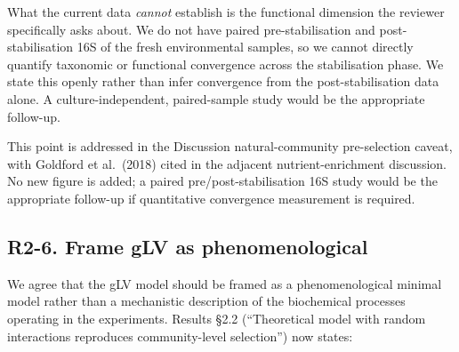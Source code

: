 What the current data \emph{cannot} establish is the functional dimension the reviewer specifically asks about. We do not have paired pre-stabilisation and post-stabilisation 16S of the fresh environmental samples, so we cannot directly quantify taxonomic or functional convergence across the stabilisation phase. We state this openly rather than infer convergence from the post-stabilisation data alone. A culture-independent, paired-sample study would be the appropriate follow-up.

This point is addressed in the Discussion natural-community pre-selection caveat, with Goldford et al.\ (2018) cited in the adjacent nutrient-enrichment discussion. No new figure is added; a paired pre/post-stabilisation 16S study would be the appropriate follow-up if quantitative convergence measurement is required.


\subsection*{R2-6. Frame gLV as phenomenological}


\responselabel
We agree that the gLV model should be framed as a phenomenological minimal model rather than a mechanistic description of the biochemical processes operating in the experiments. Results \S2.2 (``Theoretical model with random interactions reproduces community-level selection'') now states: 


